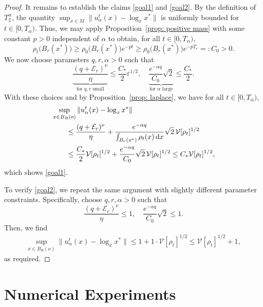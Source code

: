 \documentclass[11pt]{amsart}
\newcommand{\p}{o}%
\begin{document}
\begin{proof}
It remains to establish the claims \eqref{goal1} and \eqref{goal2}. By the definition of $T^\alpha_2$, the quantity $\sup_{x\in M}\|u_\alpha^t(x) - \log_x x^*\|$ is uniformly bounded for $t \in [0, T_\alpha)$. Thus, we may apply Proposition~\ref{prop: positive mass} with some constant $p > 0$ independent of $\alpha$ to obtain, for all $t \in [0, T_\alpha)$,
\begin{equation*}
    \rho_t\bigl(B_r(x^*)\bigr) \geq \rho_0\bigl(B_r(x^*)\bigr) e^{-pt} \geq \rho_0\bigl(B_r(x^*)\bigr) e^{-p T_\varepsilon} =: C_0 > 0.
\end{equation*}
We now choose parameters $q, r, \alpha  > 0$ such that
\begin{equation*}
    \underbrace{\frac{(q+\mathcal{E}_r)^\nu}{\eta}}_{\text{for } q,r \text{ small}} \leq \frac{C_*}{2}\varepsilon^{1/2}, \quad
    \underbrace{\frac{e^{-\alpha q}}{C_0}\sqrt{2}}_{\text{for } \alpha \text{ large}} \leq \frac{C_*}{2}.
\end{equation*}
With these choices and by Proposition~\ref{prop: laplace}, we have for all $t \in [0, T_\alpha)$,
\begin{align*}
    &\sup_{x\in B_R(\p)}\|u_\alpha^t(x) - \log_x x^*\| \notag\\
    &\qquad \leq \frac{(q+\mathcal{E}_r)^\nu}{\eta} 
               + \frac{e^{-\alpha q}}{ \int_{B_r(x^*)} \rho_t(x)\,\mathrm{d}x} \sqrt{2}\,\mathcal{V}[\rho_t]^{1/2} \notag\\
    &\qquad \leq \frac{C_*}{2}\mathcal{V}[\rho_t]^{1/2}
               + \frac{e^{-\alpha q}}{C_0}\sqrt{2}\,\mathcal{V}[\rho_t]^{1/2} 
               \leq C_* \mathcal{V}[\rho_t]^{1/2},
\end{align*}
which shows \eqref{goal1}.

To verify  \eqref{goal2}, we repeat the same argument with slightly different parameter constraints. Specifically, choose $q, r, \alpha  > 0$ such that
\begin{equation*}
    \frac{(q+\mathcal{E}_r)^\nu}{\eta} \leq 1, \quad
    \frac{e^{-\alpha q}}{C_0}\sqrt{2} \leq 1.
\end{equation*}
Then, we find 
\begin{align*}
    \sup_{x\in B_R(\p)}\|u_\alpha^t(x) - \log_x x^*\|  \leq 1 + 1 \cdot \mathcal{V}[\rho_t]^{1/2}
    \leq \mathcal{V}[\rho_t]^{1/2} + 1,
\end{align*}
as required. 
\end{proof}




\section{Numerical Experiments} \label{sec:5}
\setcounter{equation}{0}
\end{document}
